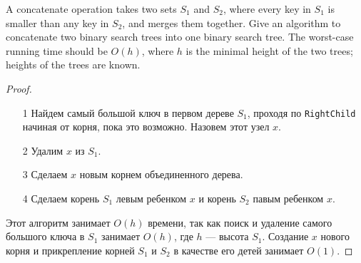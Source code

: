 \begin{prob}
A concatenate operation takes two sets $S_1$ and $S_2$, where every key in $S_1$ is smaller than any key in $S_2$, and merges them together. Give an algorithm to concatenate two binary search trees into one binary search tree. The worst-case running time should be $O(h)$, where $h$ is the minimal height of the two trees; heights of the trees are known.
\end{prob}
\vskip 0.2in
\begin{proof}
\begin{itemize}
    \item[]
    \item[1] Найдем самый большой ключ в первом дереве $S_1$, проходя по \texttt{RightChild} начиная от корня, пока это возможно. Назовем этот узел $x$.
    \item[2] Удалим $x$ из $S_1$.
    \item[3] Сделаем $x$ новым корнем объединенного дерева.
    \item[4] Сделаем корень $S_1$ левым ребенком $x$ и корень $S_2$ павым ребенком $x$.
\end{itemize}

Этот алгоритм занимает $O(h)$ времени, так как поиск и удаление самого большого ключа в $S_1$ занимает $O(h)$, где $h$ — высота $S_1$. Создание $x$ нового корня и прикрепление корней $S_1$ и $S_2$ в качестве его детей занимает $O(1)$.
\end{proof}
\vskip 0.6in



